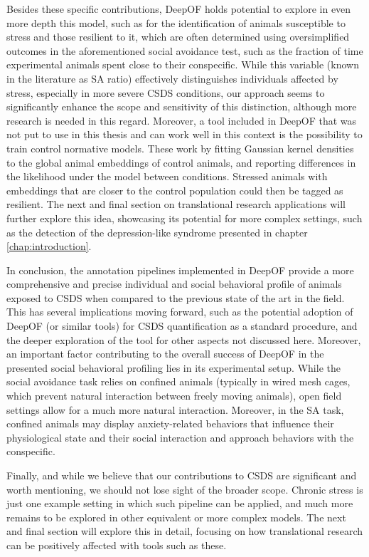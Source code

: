 Besides these specific contributions, DeepOF holds potential to explore in even more depth this model, such as for the identification of animals susceptible to stress and those resilient to it, which are often determined using oversimplified outcomes in the aforementioned social avoidance test, such as the fraction of time experimental animals spent close to their conspecific. While this variable (known in the literature as SA ratio) effectively distinguishes individuals affected by stress, especially in more severe CSDS conditions, our approach seems to significantly enhance the scope and sensitivity of this distinction, although more research is needed in this regard. Moreover, a tool included in DeepOF that was not put to use in this thesis and can work well in this context is the possibility to train control normative models. These work by fitting Gaussian kernel densities to the global animal embeddings of control animals, and reporting differences in the likelihood under the model between conditions. Stressed animals with embeddings that are closer to the control population could then be tagged as resilient. The next and final section on translational research applications will further explore this idea, showcasing its potential for more complex settings, such as the detection of the depression-like syndrome presented in chapter \ref{chap:introduction}.

In conclusion, the annotation pipelines implemented in DeepOF provide a more comprehensive and precise individual and social behavioral profile of animals exposed to CSDS when compared to the previous state of the art in the field. This has several implications moving forward, such as the potential adoption of DeepOF (or similar tools) for CSDS quantification as a standard procedure, and the deeper exploration of the tool for other aspects not discussed here. Moreover, an important factor contributing to the overall success of DeepOF in the presented social behavioral profiling lies in its experimental setup. While the social avoidance task relies on confined animals (typically in wired mesh cages, which prevent natural interaction between freely moving animals), open field settings allow for a much more natural interaction. Moreover, in the SA task, confined animals may display anxiety-related behaviors that influence their physiological state and their social interaction and approach behaviors with the conspecific.

Finally, and while we believe that our contributions to CSDS are significant and worth mentioning, we should not lose sight of the broader scope. Chronic stress is just one example setting in which such pipeline can be applied, and much more remains to be explored in other equivalent or more complex models. The next and final section will explore this in detail, focusing on how translational research can be positively affected with tools such as these.



